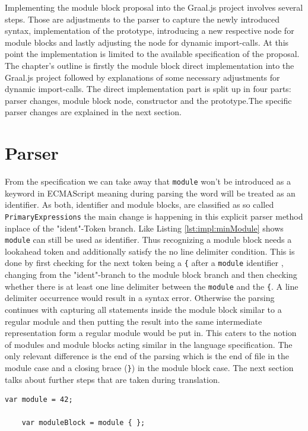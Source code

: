Implementing the module block proposal into the Graal.js project involves several steps. Those are adjustments to the parser to capture the newly introduced syntax, implementation of the prototype, introducing a new respective node for module blocks and lastly adjusting the node for dynamic import-calls. At this point the implementation is limited to the available specification of the proposal. The chapter's outline is firstly the module block direct implementation into the Graal.js project followed by explanations of some necessary adjustments for dynamic import-calls. The direct implementation part is split up in four parts: parser changes, module block node, constructor and the prototype.The specific parser changes are explained in the next section.

\section{Parser}
From the specification we can take away that \texttt{module} won't be introduced as a keyword in ECMAScript meaning during parsing the word will be treated as an identifier. As both, identifier and module blocks, are classified as so called \texttt{PrimaryExpressions} the main change is happening in this explicit parser method inplace of the "ident"-Token branch. Like Listing \ref{lst:impl:minModule} shows \texttt{module} can still be used as identifier. Thus recognizing a module block needs a lookahead token and additionally satisfy the no line delimiter condition. This is done by first checking for the next token being a \texttt{\{} after a \texttt{module} identifier , changing from the "ident"-branch to the module block branch and then checking whether there is at least one line delimiter between the \texttt{module} and the \texttt{\{}. A line delimiter occurrence would result in a syntax error. Otherwise the parsing continues with capturing all statements inside the module block similar to a regular module and then putting the result into the same intermediate representation form a regular module would be put in. This caters to the notion of modules and module blocks acting similar in the language specification. The only relevant difference is the end of the parsing which is the end of file in the module case and a closing brace (\texttt{\}}) in the module block case. The next section talks about further steps that are taken during translation.

\begin{lstlisting}[caption={Minimal module identifier example in JavaScript}, label={lst:impl:minModule}]
    var module = 42;
    
    var moduleBlock = module { };
\end{lstlisting}

